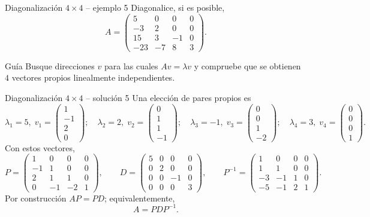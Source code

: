 \documentclass[aspectratio=169,10pt]{beamer}
\begin{document}
\begin{frame}{Diagonalización $4\times 4$ -- ejemplo 5}
\small
Diagonalice, si es posible,
\[
A=\begin{pmatrix}5 & 0 & 0 & 0\\-3 & 2 & 0 & 0\\15 & 3 & -1 & 0\\-23 & -7 & 8 & 3\end{pmatrix}.
\]
\begin{block}{Guía}
Busque direcciones $v$ para las cuales $Av=\lambda v$ y compruebe que se obtienen $4$ vectores propios linealmente independientes.
\end{block}
\end{frame}
\begin{frame}{Diagonalización $4\times 4$ -- solución 5}
\scriptsize
Una elección de pares propios es
\[
\lambda_1=5,\;v_1=\begin{pmatrix}1\\-1\\2\\0\end{pmatrix};\quad \lambda_2=2,\;v_2=\begin{pmatrix}0\\1\\1\\-1\end{pmatrix};\quad \lambda_3=-1,\;v_3=\begin{pmatrix}0\\0\\1\\-2\end{pmatrix};\quad \lambda_4=3,\;v_4=\begin{pmatrix}0\\0\\0\\1\end{pmatrix}.
\]
Con estos vectores,
\[
P=\begin{pmatrix}1 & 0 & 0 & 0\\-1 & 1 & 0 & 0\\2 & 1 & 1 & 0\\0 & -1 & -2 & 1\end{pmatrix},\qquad D=\begin{pmatrix}5 & 0 & 0 & 0\\0 & 2 & 0 & 0\\0 & 0 & -1 & 0\\0 & 0 & 0 & 3\end{pmatrix},\qquad P^{-1}=\begin{pmatrix}1 & 0 & 0 & 0\\1 & 1 & 0 & 0\\-3 & -1 & 1 & 0\\-5 & -1 & 2 & 1\end{pmatrix}.
\]
Por construcción $AP=PD$; equivalentemente,
\[
\boxed{A=PDP^{-1}}.
\]
\end{frame}
\end{document}
